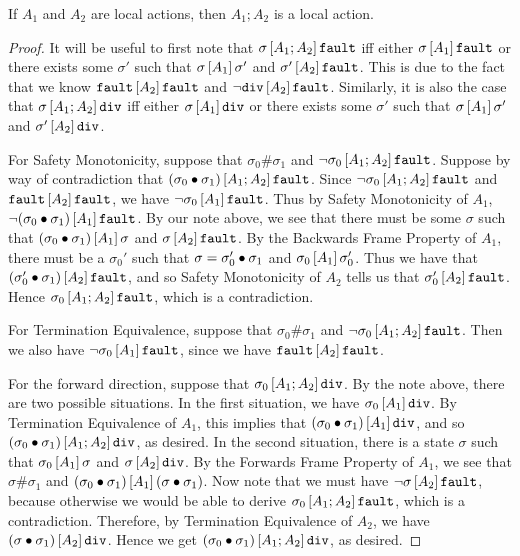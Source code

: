 \begin{lem}
If $A_1$ and $A_2$ are local actions, then $A_1;A_2$ is a local action.
\end{lem}
\ifextended
\begin{proof}
It will be useful to first note that
$\relatebr{A_1;A_2}{\sigma}{\fault}$ iff either
$\relatebr{A_1}{\sigma}{\fault}$ or there exists some $\sigma'$ such
that $\relatebr{A_1}{\sigma}{\sigma'}$ and
$\relatebr{A_2}{\sigma'}{\fault}$. This is due to the fact that we know
$\relatebr{A_2}{\fault}{\fault}$ and $\lnot
\relatebr{A_2}{\dvg}{\fault}$. Similarly, it is also the case that
$\relatebr{A_1;A_2}{\sigma}{\dvg}$ iff either
$\relatebr{A_1}{\sigma}{\dvg}$ or there exists some $\sigma'$ such that
$\relatebr{A_1}{\sigma}{\sigma'}$ and $\relatebr{A_2}{\sigma'}{\dvg}$.

For Safety Monotonicity, suppose that $\sigma_0 \# \sigma_1$ 
and $\lnot \relatebr{A_1;A_2}{\sigma_0}{\fault}$. 
Suppose by way of
contradiction that $\relatebr{A_1;A_2}{(\sigma_0 \dt \sigma_1)}{\fault}$. Since $\lnot
\relatebr{A_1;A_2}{\sigma_0}{\fault}$ and
$\relatebr{A_2}{\fault}{\fault}$, we have $\lnot
\relatebr{A_1}{\sigma_0}{\fault}$. Thus by Safety Monotonicity of $A_1$,
$\lnot \relatebr{A_1}{(\sigma_0 \dt \sigma_1)}{\fault}$. By our note
above, we see that there must be some $\sigma$ such that
$\relatebr{A_1}{(\sigma_0 \dt \sigma_1)}{\sigma}$ and
$\relatebr{A_2}{\sigma}{\fault}$. By the Backwards Frame Property of
$A_1$, there must be a $\sigma_0'$ such that $\sigma = \sigma_0' \dt
\sigma_1$ and $\relatebr{A_1}{\sigma_0}{\sigma_0'}$.  Thus we have that
$\relatebr{A_2}{(\sigma_0' \dt \sigma_1)}{\fault}$, and so Safety
Monotonicity of $A_2$ tells us that
$\relatebr{A_2}{\sigma_0'}{\fault}$. Hence
$\relatebr{A_1;A_2}{\sigma_0}{\fault}$, which is a contradiction.

For Termination Equivalence, suppose that $\sigma_0 \# \sigma_1$ 
and $\lnot \relatebr{A_1;A_2}{\sigma_0}{\fault}$. Then
we also have $\lnot \relatebr{A_1}{\sigma_0}{\fault}$, 
since we have $\relatebr{A_2}{\fault}{\fault}$. 

For the forward direction, suppose that $\relatebr{A_1;A_2}{\sigma_0}{\dvg}$. 
By the note above, there are two possible situations. In the first situation, we have $\relatebr{A_1}{\sigma_0}{\dvg}$. By
Termination Equivalence of $A_1$, this implies that $\relatebr{A_1}{(\sigma_0 \dt \sigma_1)}{\dvg}$, and so
$\relatebr{A_1;A_2}{(\sigma_0 \dt \sigma_1)}{\dvg}$, as desired. In the second situation, there is a state $\sigma$
such that $\relatebr{A_1}{\sigma_0}{\sigma}$ and $\relatebr{A_2}{\sigma}{\dvg}$. By the Forwards Frame Property of
$A_1$, we see that $\sigma \# \sigma_1$ and $\relatebr{A_1}{(\sigma_0 \dt \sigma_1)}{(\sigma \dt \sigma_1)}$. Now note
that we must have $\lnot \relatebr{A_2}{\sigma}{\fault}$, because otherwise we would be able to derive 
$\relatebr{A_1;A_2}{\sigma_0}{\fault}$, which is a contradiction. Therefore, by Termination Equivalence of $A_2$,
we have $\relatebr{A_2}{(\sigma \dt \sigma_1)}{\dvg}$. Hence we get $\relatebr{A_1;A_2}{(\sigma_0 \dt \sigma_1)}{\dvg}$,
as desired.


\end{proof}
